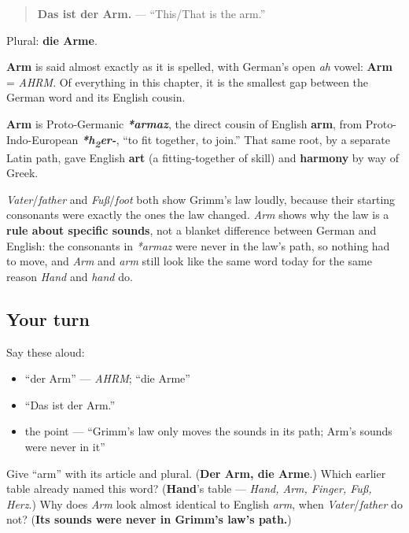\begin{quote}
\textbf{Das ist der Arm.} — \textquotedblleft{}This/That is the arm.\textquotedblright{}
\end{quote}

Plural: \textbf{die Arme}.

\begin{sounds}
\textbf{Arm} is said almost exactly as it is spelled, with German's open \emph{ah} vowel: \textbf{Arm} = \emph{AHRM}. Of everything in this chapter, it is the smallest gap between the German word and its English cousin.
\end{sounds}

\begin{cousinweb}
\textbf{Arm} is Proto-Germanic \emph{\textbf{*armaz}}, the direct cousin of English \textbf{arm}, from Proto-Indo-European \emph{\textbf{*h\textsubscript{2}er-}}, \textquotedblleft{}to fit together, to join.\textquotedblright{} That same root, by a separate Latin path, gave English \textbf{art} (a fitting-together of skill) and \textbf{harmony} by way of Greek.

\emph{Vater}/\emph{father} and \emph{Fuß}/\emph{foot} both show Grimm's law loudly, because their starting consonants were exactly the ones the law changed. \emph{Arm} shows why the law is a \textbf{rule about specific sounds}, not a blanket difference between German and English: the consonants in \emph{*armaz} were never in the law's path, so nothing had to move, and \emph{Arm} and \emph{arm} still look like the same word today for the same reason \emph{Hand} and \emph{hand} do.
\end{cousinweb}

\subsection*{Your turn}
Say these aloud:

\begin{itemize}
\raggedright
  \item \textquotedblleft{}der Arm\textquotedblright{} — \emph{AHRM}; \textquotedblleft{}die Arme\textquotedblright{}
  \item \textquotedblleft{}Das ist der Arm.\textquotedblright{}
  \item the point — \textquotedblleft{}Grimm's law only moves the sounds in its path; Arm's sounds were never in it\textquotedblright{}
\end{itemize}

\begin{tcolorbox}[breakable,colback=teal!4,colframe=teal!35!black,title={Before you move on}]
Give \textquotedblleft{}arm\textquotedblright{} with its article and plural. (\textbf{Der Arm, die Arme}.) Which earlier table already named this word? (\textbf{Hand}'s table — \emph{Hand, Arm, Finger, Fuß, Herz}.) Why does \emph{Arm} look almost identical to English \emph{arm}, when \emph{Vater}/\emph{father} do not? (\textbf{Its sounds were never in Grimm's law's path.})
\end{tcolorbox}

